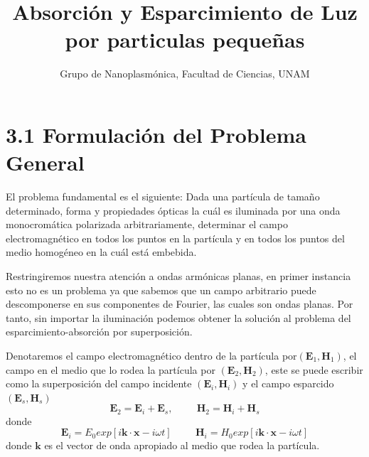 \documentclass[graybox]{svmult}
\begin{document}
\title*{Absorción y Esparcimiento de Luz por particulas pequeñas}
\author{Grupo de Nanoplasmónica, Facultad de Ciencias, UNAM}

%
%
\maketitle




\section*{3.1 Formulación del Problema General}
\label{sec:1}
El problema fundamental es el siguiente: Dada una partícula de tamaño determinado, forma y propiedades ópticas la cuál es iluminada por una onda monocromática polarizada arbitrariamente, determinar el campo electromagnético en todos los puntos en la partícula y en todos los puntos del medio homogéneo en la cuál está embebida.

Restringiremos nuestra atención a ondas armónicas planas, en primer instancia esto no es un problema ya que sabemos que un campo arbitrario puede descomponerse en sus componentes de Fourier, las cuales son ondas planas. Por tanto, sin importar la iluminación podemos obtener la solución al problema del esparcimiento-absorción por superposición.

Denotaremos el campo electromagnético dentro de la partícula por$(\textbf{E}_1,\textbf{H}_1)$, el campo en el medio que lo rodea la partícula por $(\textbf{E}_2,\textbf{H}_2)$, este se puede escribir como la superposición del campo incidente $(\textbf{E}_i,\textbf{H}_i)$ y el campo esparcido $(\textbf{E}_s,\textbf{H}_s)$
\begin{equation}
\textbf{E}_2= \textbf{E}_i + \textbf{E}_s , \hspace{1cm} \textbf{H}_2 = \textbf{H}_i + \textbf{H}_s
\end{equation}
donde
\begin{equation}
\textbf{E}_i = E_0 exp[i \textbf{k}\cdot \textbf{x}-i\omega t] \hspace{1cm} \textbf{H}_i = H_0 exp[i \textbf{k}\cdot \textbf{x}-i\omega t] 
\end{equation}
donde $\textbf{k}$ es el vector de onda apropiado al medio que rodea la partícula.
\end{document}
